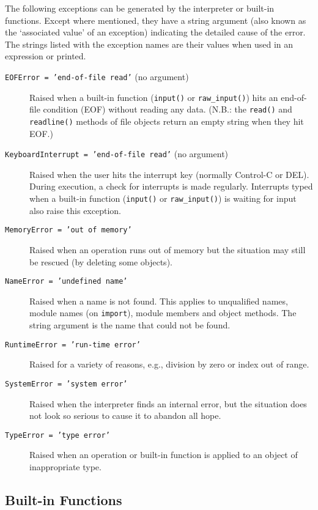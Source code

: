 The following exceptions can be generated by the interpreter or
built-in functions.
Except where mentioned, they have a string argument (also known as the
`associated value' of an exception) indicating the detailed cause of the
error.
The strings listed with the exception names are their values when used
in an expression or printed.
\begin{description}
\item[{\tt EOFError = 'end-of-file read'} (no argument)]
Raised when a built-in function ({\tt input()} or {\tt raw\_input()})
hits an end-of-file condition (EOF) without reading any data.
(N.B.: the {\tt read()} and {\tt readline()} methods of file objects
return an empty string when they hit EOF.)
\item[{\tt KeyboardInterrupt = 'end-of-file read'} (no argument)]
Raised when the user hits the interrupt key (normally Control-C or DEL).
During execution, a check for interrupts is made regularly.
Interrupts typed when a built-in function ({\tt input()} or
{\tt raw\_input()}) is waiting for input also raise this exception.
\item[{\tt MemoryError = 'out of memory'}]
Raised when an operation runs out of memory but the situation
may still be rescued (by deleting some objects).
\item[{\tt NameError = 'undefined name'}]
Raised when a name is not found.
This applies to unqualified names, module names (on {\tt import}),
module members and object methods.
The string argument is the name that could not be found.
\item[{\tt RuntimeError = 'run-time error'}]
Raised for a variety of reasons, e.g., division by zero or index out of
range.
\item[{\tt SystemError = 'system error'}]
Raised when the interpreter finds an internal error, but the situation
does not look so serious to cause it to abandon all hope.
\item[{\tt TypeError = 'type error'}]
Raised when an operation or built-in function is applied to an object of
inappropriate type.
\end{description}

\subsection{Built-in Functions}

